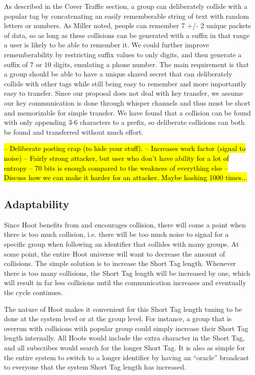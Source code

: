 As described in the Cover Traffic section, a group can deliberately collide with a popular tag by concatenating an easily rememberable string of text with random letters or numbers. As Miller\cite{miller56} noted, people can remember  
7 +/- 2 unique packets of data, so as long as these collisions can be generated with a suffix in that range a user is likely to be able to remember it. We could further improve rememberability by restricting suffix values to only digits, and then generate a suffix of 7 or 10 digits, emulating a phone number. The main requirement is that a group should be able to have a unique shared secret that can deliberately collide with other tags while still being easy to remember and more importantly easy to transfer. Since our proposal does not deal with key transfer, we assume our key communication is done through whisper channels and thus must be short and memorizable for simple transfer. We have found that a collision can be found with only appending 3-6 characters to a prefix, so deliberate collisions can both be found and transferred without much effort.

\hl{
-- Deliberate posting crap (to hide your stuff).
-- Increases work factor (signal to noise)
-- Fairly strong attacker, but user who don't have ability for a lot of entropy
-- 70 bits is enough compared to the weakness of everything else
-- Discuss how we can make it harder for an attacker. Maybe hashing 1000 times...
}

\subsection{Adaptability}

Since Hoot benefits from and encourages collision, there will come a point when there is too much collision, i.e. there will be too much noise to signal for a specific group when following an identifier that collides with many groups. At some point, the entire Hoot universe will want to decrease the amount of collisions. The simple solution is to increase the Short Tag length. Whenever there is too many collisions, the Short Tag length will be increased by one, which will result in far less collisions until the communication increases and eventually the cycle continues. 

The nature of Hoot makes it convenient for this Short Tag length tuning to be done at the system level or at the group level. For instance, a group that is overrun with collisions with popular group could simply increase their Short Tag length internally. All Hoots would include the extra character in the Short Tag, and all subscribes would search for the longer Short Tag. It is also as simple for the entire system to switch to a longer identifier by having an ``oracle'' broadcast to everyone that the system Short Tag length has increased.


